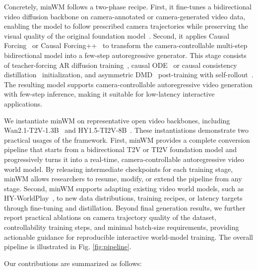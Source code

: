 Concretely, minWM follows a two-phase recipe. First, it fine-tunes a bidirectional video diffusion backbone on camera-annotated or camera-generated video data, enabling the model to follow prescribed camera trajectories while preserving the visual quality of the original foundation model~\cite{li2026cameras}. Second, it applies Causal Forcing~\cite{zhu2026causal} or Causal Forcing++~\cite{zhao2026causal} to transform the camera-controllable multi-step bidirectional model into a few-step autoregressive generator. This stage consists of teacher-forcing AR diffusion training~\cite{teng2025magi}, causal ODE~\cite{zhu2026causal} or causal consistency distillation~\cite{zhao2026causal} initialization, and asymmetric DMD~\cite{wang2023prolificdreamer,luo2023diff,yin2024one,yin2025slow} post-training with self-rollout~\cite{huang2025self}. The resulting model supports camera-controllable autoregressive video generation with few-step inference, making it suitable for low-latency interactive applications.

We instantiate minWM on representative open video backbones, including Wan2.1-T2V-1.3B~\cite{wan2025wan} and HY1.5-TI2V-8B~\cite{kong2024hunyuanvideo}. These instantiations demonstrate two practical usages of the framework. First, minWM provides a complete conversion pipeline that starts from a bidirectional T2V or TI2V foundation model and progressively turns it into a real-time, camera-controllable autoregressive video world model. By releasing intermediate checkpoints for each training stage, minWM allows researchers to resume, modify, or extend the pipeline from any stage. Second, minWM supports adapting existing video world models, such as HY-WorldPlay~\cite{sun2025worldplay}, to new data distributions, training recipes, or latency targets through fine-tuning and distillation. Beyond final generation results, we further report practical ablations on camera trajectory quality of the dataset, controllability training steps, and minimal batch-size requirements, providing actionable guidance for reproducible interactive world-model training. The overall pipeline is illustrated in Fig. \ref{fig:pipeline}.

Our contributions are summarized as follows:

